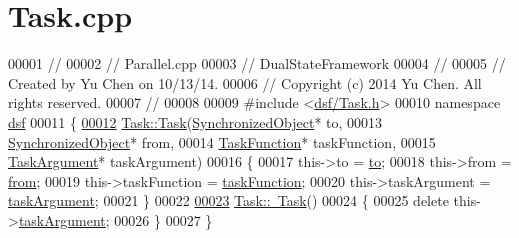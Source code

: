 \hypertarget{_task_8cpp_source}{}\section{Task.\+cpp}
\label{_task_8cpp_source}

\begin{DoxyCode}
00001 \textcolor{comment}{//}
00002 \textcolor{comment}{//  Parallel.cpp}
00003 \textcolor{comment}{//  DualStateFramework}
00004 \textcolor{comment}{//}
00005 \textcolor{comment}{//  Created by Yu Chen on 10/13/14.}
00006 \textcolor{comment}{//  Copyright (c) 2014 Yu Chen. All rights reserved.}
00007 \textcolor{comment}{//}
00008 
00009 \textcolor{preprocessor}{#include <\hyperlink{_task_8h}{dsf/Task.h}>}
00010 \textcolor{keyword}{namespace }\hyperlink{namespacedsf}{dsf}
00011 \{
\hypertarget{_task_8cpp_source_l00012}{}\hyperlink{classdsf_1_1_task_afa460a63f94f30df36df5661de1dbe1a}{00012}     \hyperlink{classdsf_1_1_task_afa460a63f94f30df36df5661de1dbe1a}{Task::Task}(\hyperlink{classdsf_1_1_synchronized_object}{SynchronizedObject}* to,
00013                \hyperlink{classdsf_1_1_synchronized_object}{SynchronizedObject}* from,
00014                \hyperlink{namespacedsf_aa16e735f29587f4485b56fc46746f7a9}{TaskFunction}* taskFunction,
00015                \hyperlink{classyc_1_1_any}{TaskArgument}* taskArgument)
00016     \{
00017         this->to = \hyperlink{classdsf_1_1_task_a36c485fbeb9c2330f5637b9d625cf01a}{to};
00018         this->from = \hyperlink{classdsf_1_1_task_afc1faf30dab0d57501dfdcb4ef7b5450}{from};
00019         this->taskFunction = \hyperlink{classdsf_1_1_task_a681617cab34fbae641c5b0cf4be46659}{taskFunction};
00020         this->taskArgument = \hyperlink{classdsf_1_1_task_a8a095d8a36668f6500d4df8c24dbef8d}{taskArgument};
00021     \}
00022     
\hypertarget{_task_8cpp_source_l00023}{}\hyperlink{classdsf_1_1_task_a617ffc1b2f418f061fbc168d74ed5a55}{00023}     \hyperlink{classdsf_1_1_task_a617ffc1b2f418f061fbc168d74ed5a55}{Task::~Task}()
00024     \{
00025         \textcolor{keyword}{delete} this->\hyperlink{classdsf_1_1_task_a8a095d8a36668f6500d4df8c24dbef8d}{taskArgument};
00026     \}
00027 \}
\end{DoxyCode}
